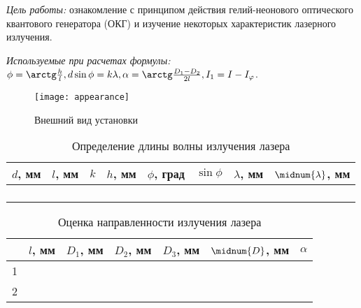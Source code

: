 \documentclass[10pt, pscyr, nonums]{hedlabwork}
\begin{document}
    \makeheader

    \emph{Цель работы:} ознакомление с принципом действия гелий-неонового
    оптического квантового генератора (ОКГ) и изучение некоторых характеристик
    лазерного излучения.
    
    \emph{Используемые при расчетах формулы:}
    \( \phi = \arctg\frac{h}{l}, d\sin\phi = k\lambda,
        \alpha = \arctg\frac{D_1 - D_2}{2l}, I_1 = I - I_\varphi \).

    \begin{figure}[h!]
        \center
        \texttt{[image: appearance]}\\
        \parbox{.4\textwidth}{\caption{Внешний вид установки}}
    \end{figure}
    \vspace*{-2em}
    
    \begin{table}[h!]
        \center \caption{Определение длины волны излучения лазера}
        \begin{tabular}{|*{8}{C{.08}|}} \hline
            \( d \), мм & \( l \), мм & \( k \) & \( h \), мм &
                \( \phi \), град & \( \sin\phi \) & \( \lambda \), мм &
                \( \midnum{\lambda} \), мм \\ \hline
             &  &&&&&&
                 \\ 
            &&&&&&& \\ \hline
             &  &&&&&&
                 \\ 
            &&&&&&& \\ \hline
        \end{tabular}
    \end{table}
    
    \begin{table}[h!]
        \center \caption{Оценка направленности излучения лазера}
        \begin{tabular}{|*{7}{C{.08}|}} \hline
            & \( l \), мм & \( D_1 \), мм & \( D_2 \), мм & \( D_3 \), мм &
                \( \midnum{D} \), мм & \( \alpha \) \\  &  &&&&& \\ 
            2 &&&&&& \\ \hline
        \end{tabular}
    \end{table}
    
\end{document}
